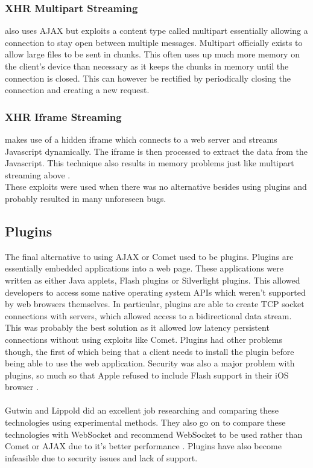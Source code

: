 \documentclass[prodmode,acmtecs]{acmsmall}
\begin{document}
\subsubsection{XHR Multipart Streaming} also uses AJAX but exploits a content type called multipart essentially allowing a connection to stay open between multiple messages. Multipart officially exists to allow large files to be sent in chunks. This often uses up much more memory on the client's device than necessary as it keeps the chunks in memory until the connection is closed. This can however be rectified by periodically closing the connection and creating a new request.
\subsubsection{XHR Iframe Streaming} makes use of a hidden iframe which connects to a web server and streams Javascript dynamically. The iframe is then processed to extract the data from the Javascript. This technique also results in memory problems just like multipart streaming above \cite{gutwin2011real}.\\

These exploits were used when there was no alternative besides using plugins and probably resulted in many unforeseen bugs.

\subsection{Plugins}
The final alternative to using AJAX or Comet used to be plugins. Plugins are essentially embedded applications into a web page. These applications were written as either Java applets, Flash plugins or Silverlight plugins. This allowed developers to access some native operating system APIs which weren't supported by web browsers themselves. In particular, plugins are able to create TCP socket connections with servers, which allowed access to a bidirectional data stream. This was probably the best solution as it allowed low latency persistent connections without using exploits like Comet. Plugins had other problems though, the first of which being that a client needs to install the plugin before being able to use the web application. Security was also a major problem with plugins, so much so that Apple refused to include Flash support in their iOS browser \cite{gutwin2011real}.\\\\

Gutwin and Lippold did an excellent job researching and comparing these technologies using experimental methods. They also go on to compare these technologies with WebSocket and recommend WebSocket to be used rather than Comet or AJAX due to it's better performance \cite{gutwin2011real}. Plugins have also become infeasible due to security issues and lack of support. \cite{wenzel2013towards}
\end{document}
